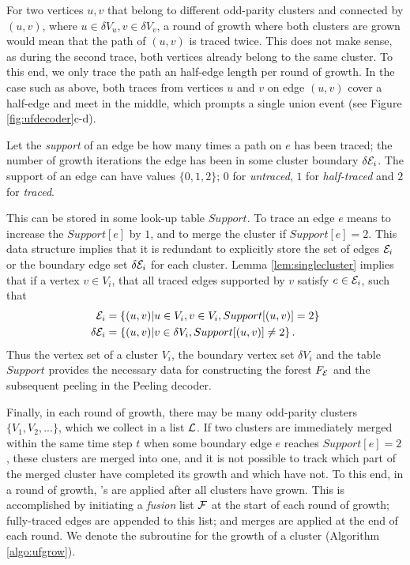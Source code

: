 For two vertices $u,v$ that belong to different odd-parity clusters and connected by $(u,v)$, where $u \in \delta V_u, v \in \delta V_v$, a round of growth where both clusters are grown would mean that the path of $(u,v)$ is traced twice. This does not make sense, as during the second trace, both vertices already belong to the same cluster. To this end, we only trace the path an half-edge length per round of growth. In the case such as above, both traces from vertices $u$ and $v$ on edge $(u,v)$ cover a half-edge and meet in the middle, which prompts a single union event (see Figure \ref{fig:ufdecoder}c-d). 
\begin{definition}\label{def:support}
  Let the \emph{support} of an edge be how many times a path on $e$ has been traced; the number of growth iterations the edge has been in some cluster boundary $\delta\mathcal{E}_i$. The support of an edge can have values $\{0,1,2\}$; $0$ for \emph{untraced}, $1$ for \emph{half-traced} and $2$ for \emph{traced}.
\end{definition}
This can be stored in some look-up table $Support$. To trace an edge $e$ means to increase the $Support[e]$ by $1$, and to merge the cluster if $Support[e]=2$. This data structure implies that it is redundant to explicitly store the set of edges $\mathcal{E}_i$ or the boundary edge set $\delta \mathcal{E}_i$ for each cluster. Lemma \ref{lem:singlecluster} implies that if a vertex $v\in V_i$, that all traced edges supported by $v$ satisfy $e \in \mathcal{E}_i$, such that
\begin{align}
  \mathcal{E}_i &= \left\{(u,v)|u\in V_i, v \in V_i, Support[(u,v)]=2\right\}\\
  \delta \mathcal{E}_i &= \left\{(u,v)| v \in \delta V_i, Support[(u,v)] \neq 2\right\}.
\end{align}
Thus the vertex set of a cluster $V_i$, the boundary vertex set $\delta V_i$ and the table $Support$ provides the necessary data for constructing the forest $F_{\mathcal{E}}$ and the subsequent peeling in the Peeling decoder.

Finally, in each round of growth, there may be many odd-parity clusters $\{V_{1}, V_{2},...\}$, which we collect in a list $\mathcal{L}$. If two clusters are immediately merged within the same time step $t$ when some boundary edge $e$ reaches $Support[e]=2$, these clusters are merged into one, and it is not possible to track which part of the merged cluster have completed its growth and which have not. To this end, in a round of growth, 's are applied after all clusters have grown. This is accomplished by initiating a \emph{fusion} list $\mathcal{F}$ at the start of each round of growth; fully-traced edges are appended to this list; and merges are applied at the end of each round. We denote the subroutine for the growth of a cluster  (Algorithm \ref{algo:ufgrow}).


